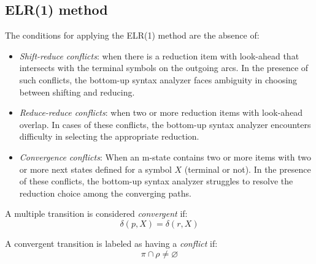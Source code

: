 \subsection{ELR(1) method}
The conditions for applying the ELR(1) method are the absence of:
\begin{itemize}
    \item \textit{Shift-reduce conflicts}: when there is a reduction item with look-ahead that intersects with the terminal symbols on the outgoing arcs. 
        In the presence of such conflicts, the bottom-up syntax analyzer faces ambiguity in choosing between shifting and reducing.
    \item \textit{Reduce-reduce conflicts}: when two or more reduction items with look-ahead overlap. 
        In cases of these conflicts, the bottom-up syntax analyzer encounters difficulty in selecting the appropriate reduction.
    \item \textit{Convergence conflicts}: When an m-state contains two or more items with two or more next states defined for a symbol $X$ (terminal or not). 
        In the presence of these conflicts, the bottom-up syntax analyzer struggles to resolve the reduction choice among the converging paths.
\end{itemize}
\begin{definition}
    A multiple transition is considered \emph{convergent} if: 
    \[\delta(p,X)=\delta(r,X)\]
\end{definition} 
\begin{definition}
    A convergent transition is labeled as having a \emph{conflict} if: 
    \[\pi \cap \rho \neq \varnothing\]
\end{definition}

